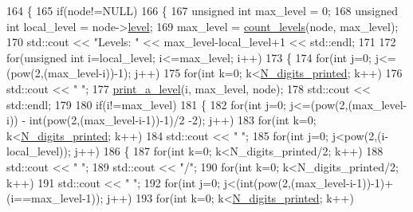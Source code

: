 \begin{DoxyCode}
164 \{
165     \textcolor{keywordflow}{if}(node!=NULL)
166     \{
167         \textcolor{keywordtype}{unsigned} \textcolor{keywordtype}{int} max\_level = 0;
168         \textcolor{keywordtype}{unsigned} \textcolor{keywordtype}{int} local\_level = node->\hyperlink{struct_node_a64a379c6dd2c75ade9687670c517b7e7}{level};
169         max\_level = \hyperlink{class_tree_afd369a246a682e225beb2d2c1c5e8c5a}{count\_levels}(node, max\_level);
170         std::cout << \textcolor{stringliteral}{"Levels: "} << max\_level-local\_level+1 << std::endl;
171         
172         \textcolor{keywordflow}{for}(\textcolor{keywordtype}{unsigned} \textcolor{keywordtype}{int} i=local\_level; i<=max\_level; i++)
173         \{
174             \textcolor{keywordflow}{for}(\textcolor{keywordtype}{int} j=0; j<=(pow(2,(max\_level-i))-1); j++)
175                 \textcolor{keywordflow}{for}(\textcolor{keywordtype}{int} k=0; k<\hyperlink{class_tree_ad24ef7cae6a7c0226280cf56bbc25f53}{N\_digits\_printed}; k++)
176                     std::cout << \textcolor{stringliteral}{" "};
177             \hyperlink{class_tree_a5d7f439dbf62845d33ed604b88260332}{print\_a\_level}(i, max\_level, node);
178             std::cout << std::endl;
179             
180             \textcolor{keywordflow}{if}(i!=max\_level)
181             \{
182                 \textcolor{keywordflow}{for}(\textcolor{keywordtype}{int} j=0; j<=(pow(2,(max\_level-i)) - int(pow(2,(max\_level-i-1))-1)/2 -2); j++)
183                     \textcolor{keywordflow}{for}(\textcolor{keywordtype}{int} k=0; k<\hyperlink{class_tree_ad24ef7cae6a7c0226280cf56bbc25f53}{N\_digits\_printed}; k++)
184                         std::cout << \textcolor{stringliteral}{" "};
185                 \textcolor{keywordflow}{for}(\textcolor{keywordtype}{int} j=0; j<pow(2,(i-local\_level)); j++)
186                 \{
187                     \textcolor{keywordflow}{for}(\textcolor{keywordtype}{int} k=0; k<N\_digits\_printed/2; k++)
188                         std::cout << \textcolor{stringliteral}{" "};
189                     std::cout << \textcolor{stringliteral}{"/"};
190                     \textcolor{keywordflow}{for}(\textcolor{keywordtype}{int} k=0; k<N\_digits\_printed/2; k++)
191                         std::cout << \textcolor{stringliteral}{" "};
192                     \textcolor{keywordflow}{for}(\textcolor{keywordtype}{int} j=0; j<(int(pow(2,(max\_level-i-1))-1)+(i==max\_level-1)); j++)
193                         \textcolor{keywordflow}{for}(\textcolor{keywordtype}{int} k=0; k<\hyperlink{class_tree_ad24ef7cae6a7c0226280cf56bbc25f53}{N\_digits\_printed}; k++)

\end{DoxyCode}

